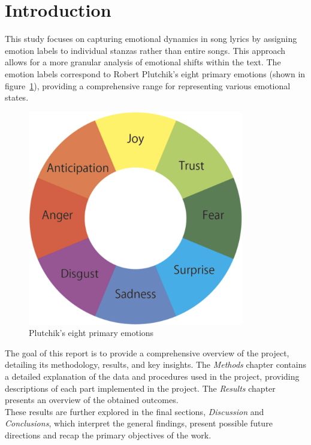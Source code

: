 \chapter*{Introduction}
\label{ch:Introduction}
This study focuses on capturing emotional dynamics in song lyrics by assigning
emotion labels to individual stanzas rather than entire songs.
This approach allows for a more granular analysis of emotional shifts within
the text.
The emotion labels correspond to Robert Plutchik's eight primary emotions
(shown in figure~\ref{fig:primary_emotions}), providing a comprehensive range
for representing various emotional states.\\
\begin{figure}[H]
    \centering
    \includegraphics[scale= 0.25]{pictures/plutchik_primary_emotions.png}
    \caption{Plutchik's eight primary emotions}
    \label{fig:primary_emotions}
\end{figure}

The goal of this report is to provide a comprehensive overview of the project,
detailing its methodology, results, and key insights. 
The \textit{Methods} chapter contains a detailed explanation of the data and
procedures used in the project, providing descriptions of each part implemented
in the project.
The \textit{Results} chapter presents an overview of the
obtained outcomes.\\
These results are further explored in the final sections, \textit{Discussion}
and \textit{Conclusions}, which interpret the general findings, present possible
future directions and recap the
primary objectives of the work.